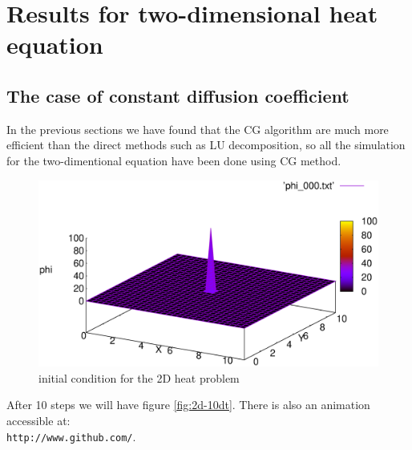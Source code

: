 \section{Results for two-dimensional heat equation}
\subsection{The case of constant diffusion coefficient}
In the previous sections we have found that the CG algorithm are much more efficient than the direct methods such as LU decomposition, so all the simulation for the two-dimentional equation have been done using CG method.
\\
\begin{figure}[ht]\centering
\includegraphics[width=\linewidth]{2DSimplefig/00}
\caption{initial condition for the 2D heat problem}
\label{fig:2d-initial_condition}
\end{figure}




After 10 steps we will have figure \ref{fig:2d-10dt}. There is also an animation accessible at: \\
  \texttt{http://www.github.com/}. \\


